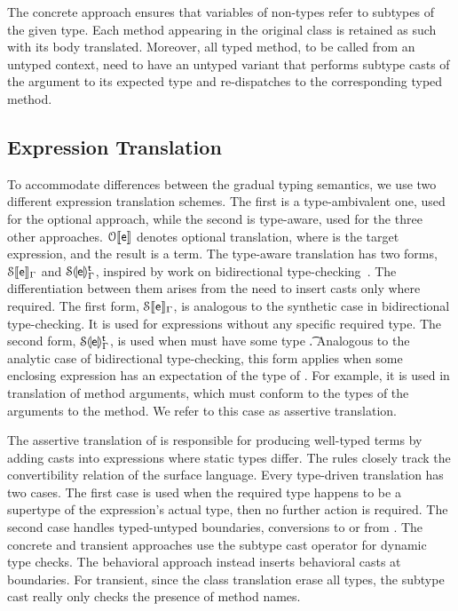 \documentclass[USenglish]{tex/lipics-v2016}
\begin{document}
\vspace{2mm} The concrete approach ensures that
variables of non-\any types refer to subtypes of the given type. Each method
appearing in the original class is retained as such with its body
translated.  Moreover, all typed method, to be called from an untyped
context, need to have an untyped variant that performs subtype casts of the
argument to its expected type and re-dispatches to the corresponding typed
method.

\subsection{Expression Translation} 

To accommodate differences between the gradual typing semantics, we use two
different expression translation schemes. The first is a type-ambivalent
one, used for the optional approach, while the second is type-aware, used
for the three other approaches.  $\TR[\OTS]\e$ denotes optional translation,
where \e is the target expression, and the result is a \kafka term.  The
type-aware translation has two forms, $\TRG[\SOMS]\e\Env$ and
$\TAG[\SOMS]\e\Env\t$, inspired by work on bidirectional
type-checking~\cite{pierce:1998:local}.  The differentiation between them
arises from the need to insert casts only where required.  The first form,
$\TRG[\SOMS]\e\Env$, is analogous to the synthetic case in bidirectional
type-checking.  It is used for expressions without any specific required
type.  The second form, $\TAG[\SOMS]\e\Env\t$, is used when \e must have
some type \t.  Analogous to the analytic case of bidirectional
type-checking, this form applies when some enclosing expression has an
expectation of the type of \e. For example, it is used in translation of
method arguments, which must conform to the types of the arguments to the
method. We refer to this case as assertive translation.

The assertive translation of  is responsible for
producing well-typed terms by adding casts into expressions where static
types differ.  The rules closely track the convertibility relation of the
surface language. Every type-driven translation has two cases. The first
case is used when the required type happens to be a supertype of the
expression's actual type, then no further action is required. The second
case handles typed-untyped boundaries, conversions to or from \any.  The
concrete and transient approaches use the subtype cast operator for dynamic
type checks. The behavioral approach instead inserts behavioral casts at
boundaries.  For transient, since the class translation erase all types, the
subtype cast really only checks the presence of method names.
\end{document}

